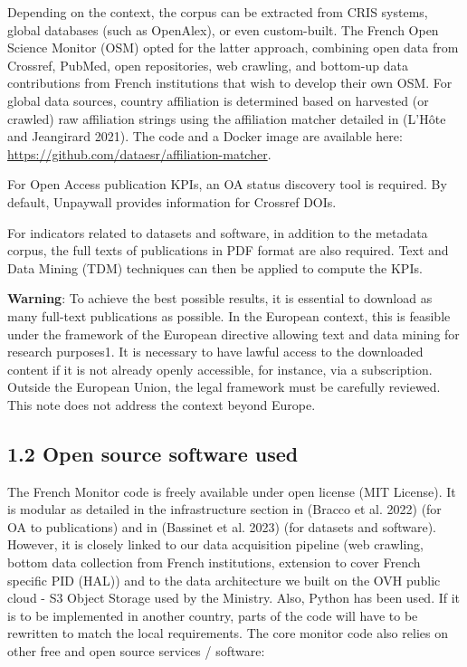 \documentclass[
]{article}
\begin{document}
Depending on the context, the corpus can be extracted from CRIS systems,
global databases (such as OpenAlex), or even custom-built. The French
Open Science Monitor (OSM) opted for the latter approach, combining open
data from Crossref, PubMed, open repositories, web crawling, and
bottom-up data contributions from French institutions that wish to
develop their own OSM. For global data sources, country affiliation is
determined based on harvested (or crawled) raw affiliation strings using
the affiliation matcher detailed in (L'Hôte and Jeangirard 2021). The
code and a Docker image are available here:
\url{https://github.com/dataesr/affiliation-matcher}.

For Open Access publication KPIs, an OA status discovery tool is
required. By default, Unpaywall provides information for Crossref DOIs.

For indicators related to datasets and software, in addition to the
metadata corpus, the full texts of publications in PDF format are also
required. Text and Data Mining (TDM) techniques can then be applied to
compute the KPIs.

\textbf{Warning}: To achieve the best possible results, it is essential
to download as many full-text publications as possible. In the European
context, this is feasible under the framework of the European directive
allowing text and data mining for research purposes1. It is necessary to
have lawful access to the downloaded content if it is not already openly
accessible, for instance, via a subscription. Outside the European
Union, the legal framework must be carefully reviewed. This note does
not address the context beyond Europe.

\hypertarget{open-source-software-used}{%
\subsection{1.2 Open source software
used}\label{open-source-software-used}}

The French Monitor code is freely available under open license (MIT
License). It is modular as detailed in the infrastructure section in
(Bracco et al. 2022) (for OA to publications) and in (Bassinet et al.
2023) (for datasets and software). However, it is closely linked to our
data acquisition pipeline (web crawling, bottom data collection from
French institutions, extension to cover French specific PID (HAL)) and
to the data architecture we built on the OVH public cloud - S3 Object
Storage used by the Ministry. Also, Python has been used. If it is to be
implemented in another country, parts of the code will have to be
rewritten to match the local requirements. The core monitor code also
relies on other free and open source services / software:
\end{document}
